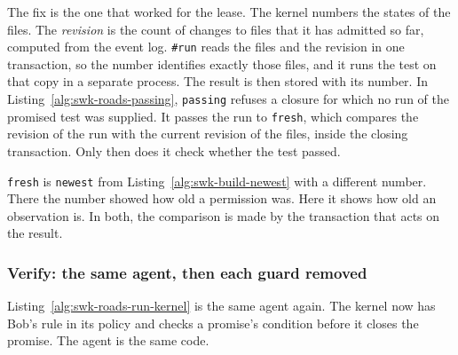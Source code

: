 
The fix is the one that worked for the lease. The kernel numbers the
states of the files. The \emph{revision} is the count of changes to files
that it has admitted so far, computed from the event log. \texttt{\#run}
reads the files and the revision in one transaction, so the number
identifies exactly those files, and it runs the test on that copy in a
separate process. The result is then stored with its number. In
Listing~\ref{alg:swk-roads-passing}, \texttt{passing} refuses a closure for
which no run of the promised test was supplied. It passes the run to
\texttt{fresh}, which compares the revision of the run with the current
revision of the files, inside the closing transaction. Only then does it
check whether the test passed.


\texttt{fresh} is \texttt{newest} from Listing~\ref{alg:swk-build-newest}
with a different number. There the number showed how old a permission was.
Here it shows how old an observation is. In both, the comparison is made by
the transaction that acts on the result.


\subsubsection{Verify: the same agent, then each guard removed}

Listing~\ref{alg:swk-roads-run-kernel} is the same agent again. The kernel now
has Bob's rule in its policy and checks a promise's condition before it closes
the promise. The agent is the same code.

